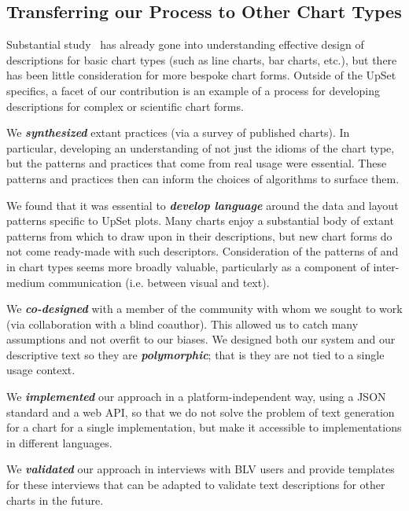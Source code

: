 \documentclass{egpubl}
\newcommand{\ie}{{i.e.}}
\begin{document}
\newcommand{\recipeWord}[1]{\textbf{\emph{#1}}}

\subsection{Transferring our Process to Other Chart Types}
Substantial study~\cite{tang_vistext_2023, nazemi_method_2013, obeid_chart-text_2020, engel_svgplott_2019} has already gone into understanding effective design of descriptions for basic chart types (such as line charts, bar charts, etc.), but there has been little consideration for more bespoke chart forms.
Outside of the UpSet specifics, a facet of our contribution is an example of a process for developing descriptions for complex or scientific chart forms.

We \recipeWord{synthesized} extant practices (via a survey of published charts). In particular, developing an understanding of not just the idioms of the chart type, but the patterns and practices that come from real usage were essential. These patterns and practices then can inform the choices of algorithms to surface them.

We found that it was essential to \recipeWord{develop language} around the data and layout patterns specific to UpSet plots.
Many charts enjoy a substantial body of extant patterns from which to draw upon in their descriptions, but new chart forms do not come ready-made with such descriptors.
Consideration of the patterns of and in chart types seems more broadly valuable, particularly as a component of inter-medium communication (\ie{} between visual and text).

We \recipeWord{co-designed} with a member of the community with whom we sought to work (via collaboration with a blind coauthor). This allowed us to catch many assumptions and not overfit to our biases.
We designed both our system and our descriptive text so they are \recipeWord{polymorphic}; that is they are not tied to a single usage context.

We \recipeWord{implemented} our approach in a platform-independent way, using a JSON standard and a web API, so that we do not solve the problem of text generation for a chart for a single implementation, but make it accessible to implementations in different languages.

We \recipeWord{validated} our approach in interviews with BLV users and provide templates for these interviews that can be adapted to validate text descriptions for other charts in the future.
\end{document}
